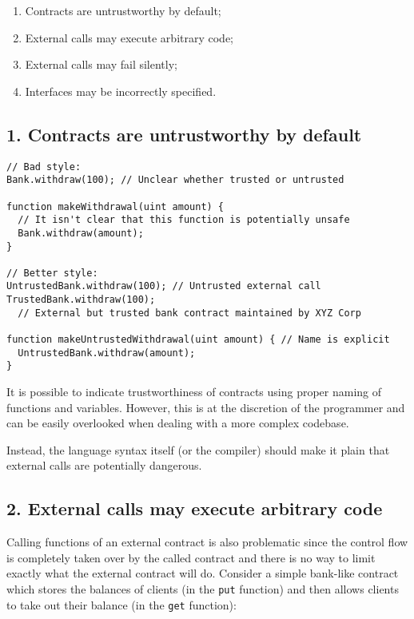 \begin{enumerate}
	\item Contracts are untrustworthy by default;
	\item External calls may execute arbitrary code;
	\item External calls may fail silently;
	\item Interfaces may be incorrectly specified.
\end{enumerate}

\subsection{1. Contracts are untrustworthy by default}

\begin{verbatim}
// Bad style:
Bank.withdraw(100); // Unclear whether trusted or untrusted

function makeWithdrawal(uint amount) {
  // It isn't clear that this function is potentially unsafe
  Bank.withdraw(amount);
}

// Better style:
UntrustedBank.withdraw(100); // Untrusted external call
TrustedBank.withdraw(100);
  // External but trusted bank contract maintained by XYZ Corp

function makeUntrustedWithdrawal(uint amount) { // Name is explicit
  UntrustedBank.withdraw(amount);
}
\end{verbatim}

It is possible to indicate trustworthiness of contracts using proper naming of functions and variables. However, this is at the discretion of the programmer and can be easily overlooked when dealing with a more complex codebase.

Instead, the language syntax itself (or the compiler) should make it plain that external calls are potentially dangerous.

\subsection{2. External calls may execute arbitrary code}

Calling functions of an external contract is also problematic since the control flow is completely taken over by the called contract and there is no way to limit exactly what the external contract will do. Consider a simple bank-like contract which stores the balances of clients (in the \texttt{put} function) and then allows clients to take out their balance (in the \texttt{get} function):

